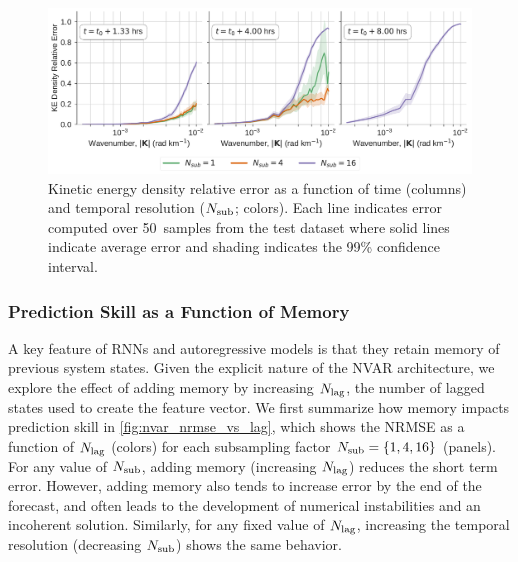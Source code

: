 \begin{figure}
    \centering
    \includegraphics[width=\textwidth]{../figures/nvar_ke_relerr.pdf}
    \caption{Kinetic energy density relative error as a function of time
        (columns) and temporal resolution ($N_\text{sub}$; colors).
        Each line indicates error computed over 50~samples from the test
        dataset where solid lines indicate average error and shading indicates
        the 99\% confidence interval.
    }
    \label{fig:nvar_spectra}
\end{figure}


\subsubsection{Prediction Skill as a Function of Memory}

A key feature of RNNs and autoregressive models is that they retain memory of
previous system states.
Given the explicit nature of the NVAR architecture, we explore the effect of
adding memory by increasing $N_\text{lag}$, the number of lagged states used to create the
feature vector.
We first summarize how memory impacts prediction skill in
\cref{fig:nvar_nrmse_vs_lag}, which shows the NRMSE as a
function of $N_\text{lag}$ (colors) for each
subsampling factor $N_\text{sub} = \{1, 4, 16\}$ (panels).
For any value of $N_\text{sub}$, adding memory (increasing $N_\text{lag}$) reduces
the short term error.
However, adding memory also tends to increase error by the end of the forecast,
and often leads to the development of numerical instabilities and an
incoherent solution.
Similarly, for any fixed value of $N_\text{lag}$, increasing the temporal resolution
(decreasing $N_\text{sub}$) shows the same behavior.

